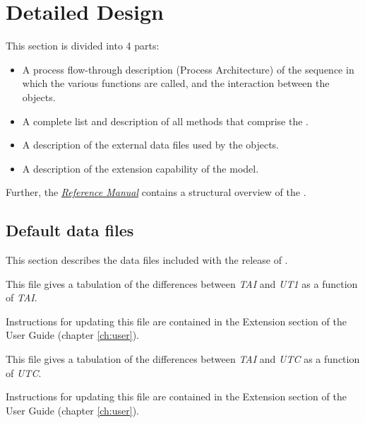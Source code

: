 

%
%
% 
%

\section{Detailed Design}

This section is divided into 4 parts:


\begin{itemize}
\item A process flow-through description (Process Architecture)
of the sequence in which the
various functions are called, and the interaction between the objects.
\item A complete list and description of all methods that comprise the
\timeDesc.
\item A description of the external data files used by the objects.
\item A description of the extension capability of the model.
\end{itemize}

Further, the
\href{file:refman.pdf} {\em Reference Manual} \cite{timebib:ReferenceManual}
contains a
structural overview of the \timeDesc.




\clearpage



\clearpage

\subsection{Default data files}
This section describes the data files included with the release
of \JEODid.

{\begin{enumerate}
This file gives a tabulation of the differences between \textit{TAI} and
\textit{UT1} as a function of \textit{TAI}.

Instructions for updating this file are contained in the Extension
section of the User Guide (chapter \ref{ch:user}).

This file gives a tabulation of the differences between \textit{TAI} and
\textit{UTC} as a function of \textit{UTC}.

Instructions for updating this file are contained in the Extension
section of the User Guide (chapter \ref{ch:user}).

\end{enumerate}}



